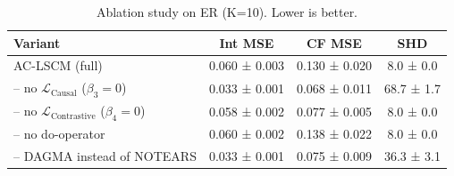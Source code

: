 \begin{table}[h]
\centering
\caption{Ablation study on ER (K=10). Lower is better.}
\label{tab:ablation}
\small
\begin{tabular}{lccc}
\toprule
Variant & Int MSE & CF MSE & SHD \\
\midrule
AC-LSCM (full) & 0.060 ± 0.003 & 0.130 ± 0.020 & 8.0 ± 0.0 \\
-- no $\mathcal{L}_{\text{Causal}}$ ($\beta_3=0$) & 0.033 ± 0.001 & 0.068 ± 0.011 & 68.7 ± 1.7 \\
-- no $\mathcal{L}_{\text{Contrastive}}$ ($\beta_4=0$) & 0.058 ± 0.002 & 0.077 ± 0.005 & 8.0 ± 0.0 \\
-- no do-operator & 0.060 ± 0.002 & 0.138 ± 0.022 & 8.0 ± 0.0 \\
-- DAGMA instead of NOTEARS & 0.033 ± 0.001 & 0.075 ± 0.009 & 36.3 ± 3.1 \\
\bottomrule
\end{tabular}
\end{table}